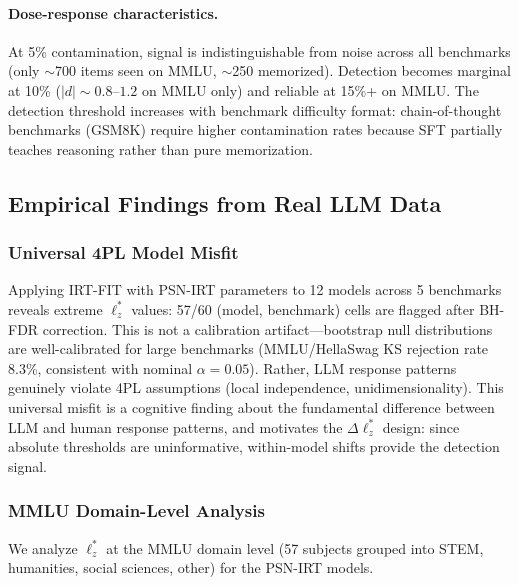 \documentclass[11pt,a4paper]{article}
\begin{document}
\paragraph{Dose-response characteristics.} At 5\% contamination, signal is indistinguishable from noise across all benchmarks (only $\sim$700 items seen on MMLU, $\sim$250 memorized). Detection becomes marginal at 10\% ($|d| \sim 0.8$--$1.2$ on MMLU only) and reliable at 15\%+ on MMLU. The detection threshold increases with benchmark difficulty format: chain-of-thought benchmarks (GSM8K) require higher contamination rates because SFT partially teaches reasoning rather than pure memorization.

\subsection{Empirical Findings from Real LLM Data}

\subsubsection{Universal 4PL Model Misfit}\label{sec:universal_misfit}

Applying IRT-FIT with PSN-IRT parameters to 12 models across 5 benchmarks reveals extreme $\ell_z^*$ values: 57/60 (model, benchmark) cells are flagged after BH-FDR correction. This is not a calibration artifact---bootstrap null distributions are well-calibrated for large benchmarks (MMLU/HellaSwag KS rejection rate 8.3\%, consistent with nominal $\alpha = 0.05$). Rather, LLM response patterns genuinely violate 4PL assumptions (local independence, unidimensionality). This universal misfit is a cognitive finding about the fundamental difference between LLM and human response patterns, and motivates the $\Delta\ell_z^*$ design: since absolute thresholds are uninformative, within-model shifts provide the detection signal.

\subsubsection{MMLU Domain-Level Analysis}\label{sec:domain}

We analyze $\ell_z^*$ at the MMLU domain level (57 subjects grouped into STEM, humanities, social sciences, other) for the PSN-IRT models.
\end{document}

